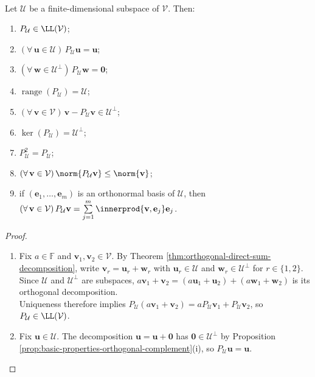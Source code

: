 \begin{proposition} \label{prop:orthogonal-projection-properties} \\
Let $\mathcal{U}$ be a finite-dimensional subspace of $\mathcal{V}$. Then:
\begin{enumerate}[label=(\roman*)]
\setlength{\itemsep}{0pt}
\item $P_{\mathcal{U}}\in\LL(\mathcal{V})$;
\item $(\forall\,\mathbf{u}\in\mathcal{U})\,P_{\mathcal{U}}\mathbf{u}=\mathbf{u}$;
\item $(\forall\,\mathbf{w}\in\mathcal{U}^{\perp})\,P_{\mathcal{U}}\mathbf{w}=\mathbf{0}$;
\item $\operatorname{range}(P_{\mathcal{U}})=\mathcal{U}$;
\item $(\forall\,\mathbf{v}\in\mathcal{V})\,\mathbf{v}-P_{\mathcal{U}}\mathbf{v}\in\mathcal{U}^{\perp}$;
\item $\ker(P_{\mathcal{U}})=\mathcal{U}^{\perp}$;
\item $P_{\mathcal{U}}^2=P_{\mathcal{U}}$;
\item $(\forall\,\mathbf{v}\in\mathcal{V})\,\norm{P_{\mathcal{U}}\mathbf{v}}\leq\norm{\mathbf{v}}$;
\item if $(\mathbf{e}_1,\ldots,\mathbf{e}_m)$ is an orthonormal basis of $\mathcal{U}$, then $(\forall\,\mathbf{v}\in\mathcal{V})\,P_{\mathcal{U}}\mathbf{v}=\sum\limits_{j=1}^{m}\innerprod{\mathbf{v},\mathbf{e}_j}\mathbf{e}_j$.
\end{enumerate}
\begin{proof}
\begin{enumerate}[label=(\roman*)]
\setlength{\itemsep}{0pt}
\item Fix $a\in\mathbb{F}$ and $\mathbf{v}_1,\mathbf{v}_2\in\mathcal{V}$. By Theorem \ref{thm:orthogonal-direct-sum-decomposition}, write $\mathbf{v}_r=\mathbf{u}_r+\mathbf{w}_r$ with $\mathbf{u}_r\in\mathcal{U}$ and $\mathbf{w}_r\in\mathcal{U}^{\perp}$ for $r\in\{1,2\}$.\\
Since $\mathcal{U}$ and $\mathcal{U}^{\perp}$ are subspaces, $a\mathbf{v}_1+\mathbf{v}_2=(a\mathbf{u}_1+\mathbf{u}_2)+(a\mathbf{w}_1+\mathbf{w}_2)$ is its orthogonal decomposition.\\
Uniqueness therefore implies $P_{\mathcal{U}}(a\mathbf{v}_1+\mathbf{v}_2)=aP_{\mathcal{U}}\mathbf{v}_1+P_{\mathcal{U}}\mathbf{v}_2$, so $P_{\mathcal{U}}\in\LL(\mathcal{V})$.
\item Fix $\mathbf{u}\in\mathcal{U}$. The decomposition $\mathbf{u}=\mathbf{u}+\mathbf{0}$ has $\mathbf{0}\in\mathcal{U}^{\perp}$ by Proposition \ref{prop:basic-properties-orthogonal-complement}(i), so $P_{\mathcal{U}}\mathbf{u}=\mathbf{u}$.

\end{enumerate}
\end{proof}
\end{proposition}
